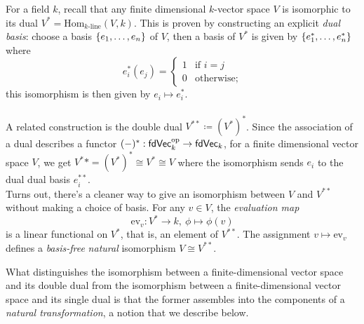 \begin{example}\label{dualex}
For a field $k$, recall that any finite dimensional $k$-vector space $V$ is isomorphic to its dual $V^* = \mathrm{Hom}_{k\text{-line}}(V,k)$. This is proven by constructing an explicit \emph{dual basis}: choose a basis $\left\{e_1,\ldots,e_n\right\}$ of $V$, then a basis of $V^*$ is given by $\left\{e_1^*,\ldots,e_n^*\right\}$ where
\[e_i^*(e_j) = \begin{cases} 1 & \text{if $i = j$}\\ 0 & \text{otherwise};\end{cases}\]
this isomorphism is then given by $e_i \mapsto e_i^*$.\\
\\
A related construction is the double dual $V^{**} \coloneqq (V^*)^*$. Since the association of a dual describes a functor $(-)^*:\mathsf{fdVec}_k^{\text{op}} \to \mathsf{fdVec}_k$, for a finite dimensional vector space $V$, we get $V^** = (V^*)^* \cong V^* \cong V$ where the isomorphism sends $e_i$ to the dual dual basis $e_i^{**}$.\\[0.5em]
Turns out, there's a cleaner way to give an isomorphism between $V$ and $V^{**}$ without making a choice of basis. For any $v \in V$, the \emph{evaluation map}
\[\mathrm{ev}_v:V^* \to k,\ \phi \mapsto \phi(v)\]
is a linear functional on $V^*$, that is, an element of $V^{**}$. The assignment $v \mapsto \mathrm{ev}_v$ defines a \emph{basis-free} \emph{natural} isomorphism $V \cong V^{**}$.
\end{example}


What distinguishes the isomorphism between a finite-dimensional vector space and its double dual from the isomorphism between a finite-dimensional vector space and its single dual is that the former assembles into the components of a \emph{natural transformation}, a notion that we describe below.

\vspace*{0.1in}


